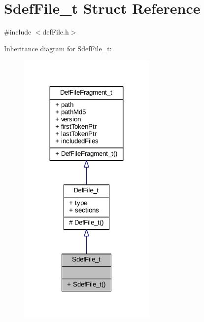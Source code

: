 \hypertarget{struct_sdef_file__t}{}\section{Sdef\+File\+\_\+t Struct Reference}
\label{struct_sdef_file__t}


{\ttfamily \#include $<$def\+File.\+h$>$}



Inheritance diagram for Sdef\+File\+\_\+t\+:
\nopagebreak
\begin{figure}[H]
\begin{center}
\leavevmode
\includegraphics[width=191pt]{struct_sdef_file__t__inherit__graph}
\end{center}
\end{figure}


